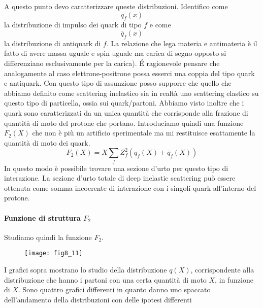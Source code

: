A questo punto devo caratterizzare queste distribuzioni.
Identifico come 
\[
q_f(x)
\]
la distribuzione di impulso dei quark di tipo $f$ e come
\[
\bar{q}_f(x)
\]
la distribuzione di antiquark di $f$.
La relazione che lega materia e antimateria è il fatto di avere massa uguale e spin uguale ma carica di segno opposto si differenziano esclusivamente per la carica).
\'E ragionevole pensare che analogamente al caso elettrone-positrone possa esserci una coppia del tipo quark e antiquark.
Con questo tipo di assunzione posso supporre che quello che abbiamo definito come scattering inelastico sia in realtà uno scattering elastico su questo tipo di particella, ossia sui quark/partoni.
Abbiamo visto inoltre che i quark sono caratterizzati da un unica quantità che corrisponde alla frazione di quantità di moto del protone che portano.
Introduciamo quindi una funzione $F_2(X)$ che non è più un artificio sperimentale ma mi restituisce esattamente la quantità di moto dei quark.
\begin{equation}
F_2(X)=X\sum_f Z_f^2(q_f(X)+\bar{q}_f(X))
\end{equation}
In questo modo è possibile trovare una sezione d'urto per questo tipo di interazione.
La sezione d'urto totale di deep inelastic scattering può essere ottenuta come somma incoerente di interazione con i singoli quark all'interno del protone.

\paragraph{Funzione di struttura $F_2$}
Studiamo quindi la funzione $F_2$.
\begin{figure}
\centering
\texttt{[image: fig8\_11]}
\end{figure}

I grafici sopra mostrano lo studio della distribuzione $q(X)$, corrispondente alla distribuzione che hanno i partoni con una certa quantità di moto $X$, in funzione di $X$.
Sono quattro grafici differenti in quanto danno uno spaccato dell'andamento della distribuzioni con delle ipotesi differenti


